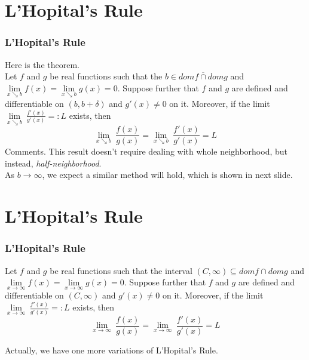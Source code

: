 \documentclass[12pt, t]{beamer}
\renewcommand{\emph}[1]{{\color{Turquoise3}\textsl{#1}}}
\begin{document}
\section{L'Hopital's Rule}
\begin{frame}
    \frametitle{L'Hopital's Rule}
Here is the theorem.\\
\hspace{1em}
Let $f$ and $g$ be real functions such that the $b\in\overline{domf\cap domg}$ and 
$\underset{x\searrow b}{\lim}f(x)=\underset{x\searrow b}{\lim}g(x)=0$. Suppose further that $f$ and $g$ are defined and differentiable on 
$(b,b+\delta)$ and $g'(x)\neq 0$ on it. Moreover, if the limit $\underset{x\searrow b}{\lim}\ \frac{f'(x)}{g'(x)}=:L$ exists, then 
\begin{equation*}
    \underset{x\searrow b}{\lim}\ \frac{f(x)}{g(x)}=\underset{x\searrow b}{\lim}\ \frac{f'(x)}{g'(x)}=L
\end{equation*}
Comments. This result doesn't require dealing with whole neighborhood, but instead, \emph{half-neighborhood}.\\
\vspace{0.5em}
\hspace{1em} 
As $b\rightarrow \infty$, we expect a similar method will hold, which is shown in next slide.
\end{frame}

\section{L'Hopital's Rule}
\begin{frame}
    \frametitle{L'Hopital's Rule}
Let $f$ and $g$ be real functions such that the interval $(C,\infty)\subseteq domf\cap domg$ and 
$\underset{x\rightarrow \infty }{\lim}f(x)=\underset{x\rightarrow \infty }{\lim}g(x)=0$. Suppose further that $f$ and $g$ are defined 
and differentiable on $(C,\infty)$ and $g'(x)\neq 0$ on it. Moreover, if the limit $\underset{x\rightarrow \infty }{\lim}\ \frac{f'(x)}{g'(x)}=:L$ exists, then 
\begin{equation*}
    \underset{x\rightarrow\infty}{\lim}\ \frac{f(x)}{g(x)}=\underset{x\rightarrow\infty}{\lim}\ \frac{f'(x)}{g'(x)}=L
\end{equation*}
    
\vspace{0.5em}
\hspace{1em}
Actually, we have one more variations of L'Hopital's Rule.
\end{frame}
\end{document}
